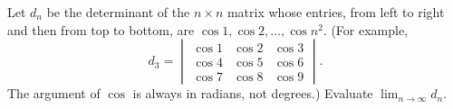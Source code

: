 Let $d_n$ be the determinant of the $n\times n$ matrix whose entries, from left to right and then from top to bottom, are $\cos1,\cos2,\ldots,\cos n^2$. (For example, \[d_3=
\begin{vmatrix}
	\cos1 & \cos2 & \cos3 \\
	\cos4 & \cos5 & \cos6 \\
	\cos7 & \cos8 & \cos9
\end{vmatrix}
.\] The argument of $\cos$ is always in radians, not degrees.) Evaluate $\displaystyle\lim_{n\to\infty}d_n$.